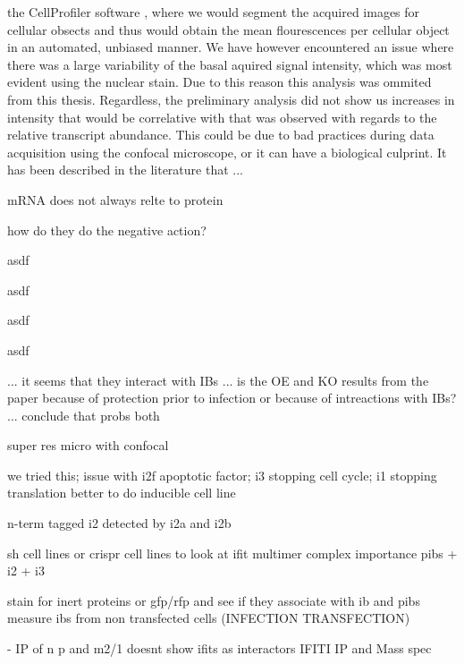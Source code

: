 the CellProfiler software \cite{McQuin2018CellProfilerBiology}, where we would segment the acquired images for cellular obsects and thus would obtain the mean flourescences per cellular object in an automated, unbiased manner. We have however encountered an issue where there was a large variability of the basal aquired signal intensity, which was most evident using the nuclear stain. Due to this reason this analysis was ommited from this thesis. Regardless, the preliminary analysis did not show us increases in intensity that would be correlative with that was observed with regards to the relative transcript abundance. This could be due to bad practices during data acquisition using the confocal microscope, or it can have a biological culprint. It has been described in the literature that ... \cite{Liu2016OnAbundance, Buccitelli2020MRNAsControl}

mRNA does not always relte to protein 


how do they do the negative action?

asdf

asdf

asdf

asdf


... it seems that they interact with IBs ... is the OE and KO results from the paper because of protection prior to infection or because of intreactions with IBs? ... conclude that probs both



super res micro with confocal


we tried this; issue with i2f apoptotic factor; i3 stopping cell cycle; i1 stopping translation
better to do inducible cell line

n-term tagged i2 detected by i2a and i2b

sh cell lines or crispr cell lines to look at ifit multimer complex importance
pibs + i2 + i3

stain for inert proteins or gfp/rfp and see if they associate with ib and pibs
measure ibs from non transfected cells (INFECTION TRANSFECTION)

\cite{Oliveira2013HumanCells} - IP of n p and m2/1 doesnt show ifits as interactors
IFITI IP and Mass spec

